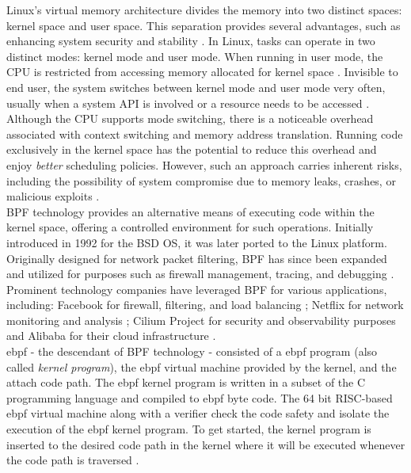 Linux's virtual memory architecture divides the memory into two distinct spaces: kernel space and user space. This separation provides several advantages, such as enhancing system security and stability \cite{understanding_the_linux_kernel_bovet_cassetti}.
In Linux, tasks can operate in two distinct modes: kernel mode and user mode. When running in user mode, the CPU is restricted from accessing memory allocated for kernel space \cite{kerrisk_linux_2010}.
Invisible to end user, the system switches between kernel mode and user mode very often, usually when a system \ac{API} is involved or a resource needs to be accessed \cite{Robert_linux_kernel_dev}.
Although the CPU supports mode switching, there is a noticeable overhead associated with context switching and memory address translation. 
Running code exclusively in the kernel space has the potential to reduce this overhead and enjoy \textit{better} scheduling policies. 
However, such an approach carries inherent risks, including the possibility of system compromise due to memory leaks, crashes, or malicious exploits \cite{lwn_detect_kernel_mem_leak} \cite{emamdoost_detecting_2021}.
\\

\ac{BPF} technology provides an alternative means of executing code within the kernel space, offering a controlled environment for such operations. 
Initially introduced in 1992 for the \ac{BSD} OS, it was later ported to the Linux platform. 
Originally designed for network packet filtering, \ac{BPF} has since been expanded and utilized for purposes such as firewall management, tracing, and debugging \cite{McCanne_intro_bpf} \cite{lwn_intro_ebpf}. 
Prominent technology companies have leveraged \ac{BPF} for various applications, including: Facebook for firewall, filtering, and load balancing \cite{facebook_katran_ebpf_2018}; Netflix for network monitoring and analysis \cite{netflix_network_insight}; Cilium Project for security and observability purposes \cite{cilium_io_page} and Alibaba for their cloud infrastructure \cite{alibaba_cloud_ebpf}.
\\

\ac{ebpf} - the descendant of \ac{BPF} technology - consisted of a \ac{ebpf} program (also called \textit{kernel program}), the \ac{ebpf} virtual machine provided by the kernel, and the attach code path.
The \ac{ebpf} kernel program is written in a subset of the C programming language and compiled to \ac{ebpf} byte code.
The 64 bit \ac{RISC}-based \ac{ebpf} virtual machine along with a verifier check the code safety and isolate the execution of the \ac{ebpf} kernel program.
To get started, the kernel program is inserted to the desired code path in the kernel where it will be executed whenever the code path is traversed \cite{lwn_intro_ebpf}.

